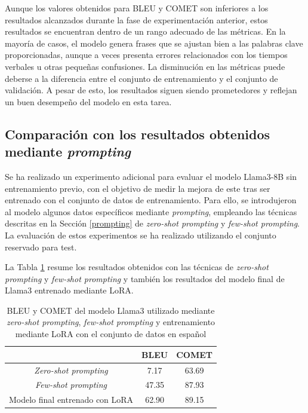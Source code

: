\documentclass[11pt,spanish,listoffigures,listoftables]{tfgetsinf}
\begin{document}
Aunque los valores obtenidos para BLEU y COMET son inferiores a los resultados alcanzados durante la fase de experimentación anterior, estos resultados se encuentran dentro de un rango adecuado de las métricas. En la mayoría de casos, el modelo genera frases que se ajustan bien a las palabras clave proporcionadas, aunque a veces presenta errores relacionados con los tiempos verbales u otras pequeñas confusiones. La disminución en las métricas puede deberse a la diferencia entre el conjunto de entrenamiento y el conjunto de validación. A pesar de esto, los resultados siguen siendo prometedores y reflejan un buen desempeño del modelo en esta tarea.

\subsection{Comparación con los resultados obtenidos mediante \textit{prompting}}

Se ha realizado un experimento adicional para evaluar el modelo Llama3-8B sin entrenamiento previo, con el objetivo de medir la mejora de este tras ser entrenado con el conjunto de datos de entrenamiento. Para ello, se introdujeron al modelo algunos datos específicos mediante
 \textit{prompting}, empleando las técnicas descritas en la Sección \ref{prompting} de \textit{zero-shot prompting} y \textit{few-shot prompting}. La evaluación de estos experimentos se ha realizado utilizando el conjunto reservado para test.

La Tabla \ref{tab:promptingEspañol} resume los resultados obtenidos con las técnicas de \textit{zero-shot prompting} y \textit{few-shot prompting}  y también los resultados del modelo final de Llama3 entrenado mediante LoRA.

\begin{table}[!h]
\caption{BLEU y COMET del modelo Llama3 utilizado mediante \textit{zero-shot prompting}, \textit{few-shot prompting} y entrenamiento mediante LoRA con el conjunto de datos en español}
\begin{center}
\begin{tabular}{ c | c c }
	\ & BLEU & COMET \\
	\hline
	\hline
	\textit{Zero-shot prompting} & 7.17 & 63.69  \\
	\textit{Few-shot prompting} & 47.35 & 87.93 \\
	Modelo final entrenado con LoRA & 62.90 & 89.15 \\

\end{tabular}
\end{center}
\label{tab:promptingEspañol}
\end{table}
\end{document}
